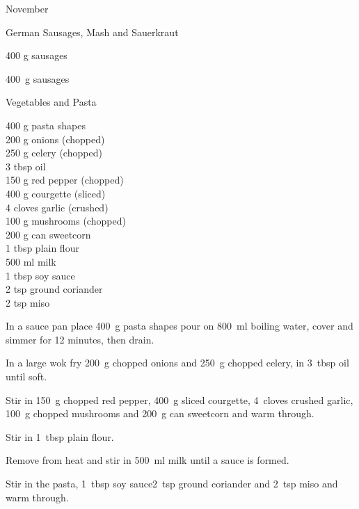 \begin{menu}{November}
    \begin{recipe}{2}{German Sausages, Mash and Sauerkraut}%
		\begin{ingredients}
		400 g sausages  \\
	
		\end{ingredients}
	
	
    \begin{instructions}
    \item 400~g  sausages
    \end{instructions}
    \end{recipe}%
  
    \begin{recipe}{2}{Vegetables and Pasta}%
		\begin{ingredients}
		400 g pasta shapes  \\
	200 g onions (chopped) \\
	250 g celery (chopped) \\
	3 tbsp oil  \\
	150 g red pepper (chopped) \\
	400 g courgette (sliced) \\
	4 cloves garlic (crushed) \\
	100 g mushrooms (chopped) \\
	200 g can sweetcorn  \\
	1 tbsp plain flour  \\
	500 ml milk  \\
	1 tbsp soy sauce  \\
	2 tsp ground coriander  \\
	2 tsp miso  \\
	
		\end{ingredients}
	
	
    \begin{instructions}
    \item 
    In a
    sauce pan
    place
    400~g  pasta shapes
    pour on
    800~ml  boiling water,
    cover and simmer for 12 minutes, then drain.
  \item 
        In a large wok fry
        200~g chopped onions
        and
        250~g chopped celery,
        in
        3~tbsp  oil
        until soft.
      \item 
        Stir in
        150~g chopped red pepper,
        400~g sliced courgette,
        4~cloves crushed garlic,
        100~g chopped mushrooms
        and
        200~g  can sweetcorn
        and warm through.
      \item 
        Stir in
        1~tbsp  plain flour.
      \item 
        Remove from heat and stir in
        500~ml  milk
        until a sauce is formed.
      \item 
        Stir in
        the pasta,
        1~tbsp  soy sauce2~tsp  ground coriander
        and
        2~tsp  miso
        and warm through.
      

\end{instructions}
\end{recipe}
\end{menu}
